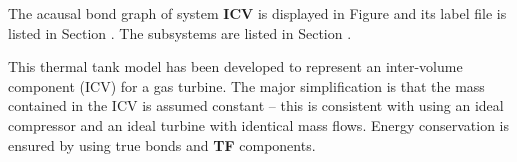 

   The acausal bond graph of system \textbf{ICV} is
   displayed in Figure  and its label
   file is listed in Section .
   The subsystems are listed in Section .
   
   This thermal tank model has been developed to represent an
   inter-volume component (ICV) for a gas turbine. The major
   simplification is that the mass contained in the ICV is assumed
   constant -- this is consistent with using an ideal compressor and an
   ideal turbine with identical mass flows. Energy conservation is
   ensured by using true bonds and \textbf{TF} components.

